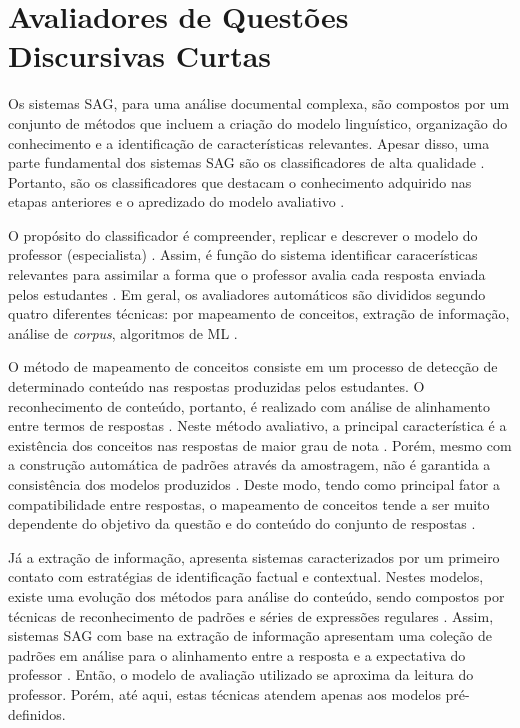 \section{Avaliadores de Questões Discursivas Curtas}

Os sistemas SAG, para uma análise documental complexa, são compostos por um conjunto de métodos que incluem a criação do modelo linguístico, organização do conhecimento e a identificação de características relevantes. Apesar disso, uma parte fundamental dos sistemas SAG são os classificadores de alta qualidade \cite{funayama2020}. Portanto, são os classificadores que destacam o conhecimento adquirido nas etapas anteriores e o apredizado do modelo avaliativo \cite{mohler2011}.

O propósito do classificador é compreender, replicar e descrever o modelo do professor (especialista) \cite{yang2021}. Assim, é função do sistema identificar caracerísticas relevantes para assimilar a forma que o professor avalia cada resposta enviada pelos estudantes \cite{jordan2012, mao2018}. Em geral, os avaliadores automáticos são divididos segundo quatro diferentes técnicas: por mapeamento de conceitos, extração de informação, análise de \textit{corpus}, algoritmos de ML \cite{burrows2015}. 

O método de mapeamento de conceitos consiste em um processo de detecção de determinado conteúdo nas respostas produzidas pelos estudantes. O reconhecimento de conteúdo, portanto, é realizado com análise de alinhamento entre termos de respostas \cite{jimenez2013, zhang2020}. Neste método avaliativo, a principal característica é a existência dos conceitos nas respostas de maior grau de nota \cite{kar2017, chakraborty2017}. Porém, mesmo com a construção automática de padrões através da amostragem, não é garantida a consistência dos modelos produzidos \cite{azad2020}. Deste modo, tendo como principal fator a compatibilidade entre respostas, o mapeamento de conceitos tende a ser muito dependente do objetivo da questão e do conteúdo do conjunto de respostas \cite{filighera2020}.

Já a extração de informação, apresenta sistemas caracterizados por um primeiro contato com estratégias de identificação factual e contextual. Nestes modelos, existe uma evolução dos métodos para análise do conteúdo, sendo compostos por técnicas de reconhecimento de padrões e séries de expressões regulares \cite{ramachandran2015b, butcher2010}. Assim, sistemas SAG com base na extração de informação apresentam uma coleção de padrões em análise para o alinhamento entre a resposta e a expectativa do professor \cite{tan2020}. Então, o modelo de avaliação utilizado se aproxima da leitura do professor. Porém, até aqui, estas técnicas atendem apenas aos modelos pré-definidos.

